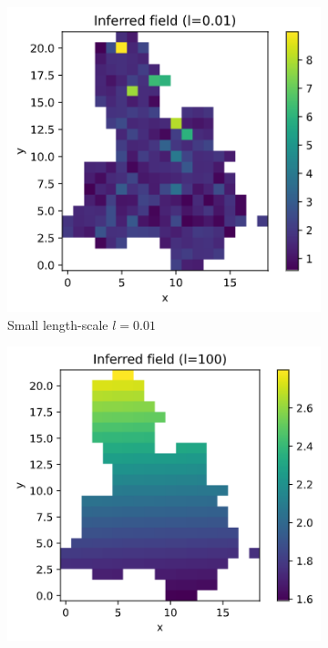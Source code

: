 \documentclass[]{article}
\begin{document}
\begin{figure}[!h]
	\centering
	\begin{subfigure}{0.31\linewidth}
		\includegraphics[width=\linewidth]{c-hat-l-small.png}
		\caption{Small length-scale $l=0.01$}
		\label{fig:l-small}
	\end{subfigure}
	\begin{subfigure}{0.32\linewidth}
		\includegraphics[width=\linewidth]{c-hat-l-big.png}

\end{subfigure}
\end{figure}
\end{document}
